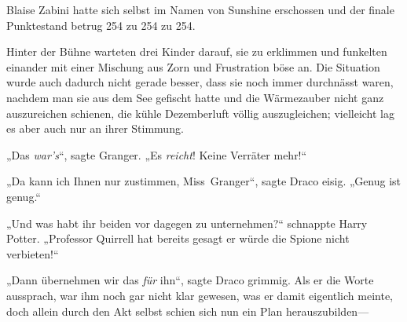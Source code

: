 Blaise Zabini hatte sich selbst im Namen von Sunshine erschossen und der finale Punktestand betrug 254 zu 254 zu 254.

\later

Hinter der Bühne warteten drei Kinder darauf, sie zu erklimmen und funkelten einander mit einer Mischung aus Zorn und Frustration böse an. Die Situation wurde auch dadurch nicht gerade besser, dass sie noch immer durchnässt waren, nachdem man sie aus dem See gefischt hatte und die Wärmezauber nicht ganz auszureichen schienen, die kühle Dezemberluft völlig auszugleichen; vielleicht lag es aber auch nur an ihrer Stimmung.

„Das \emph{war’s}“, sagte Granger. „Es \emph{reicht}! Keine Verräter mehr!“

„Da kann ich Ihnen nur zustimmen, Miss~Granger“, sagte Draco eisig. „Genug ist genug.“

„Und was habt ihr beiden vor dagegen zu unternehmen?“ schnappte Harry Potter. „Professor Quirrell hat bereits gesagt er würde die Spione nicht verbieten!“

„Dann übernehmen wir das \emph{für} ihn“, sagte Draco grimmig. Als er die Worte aussprach, war ihm noch gar nicht klar gewesen, was er damit eigentlich meinte, doch allein durch den Akt selbst schien sich nun ein Plan herauszubilden—

\later

